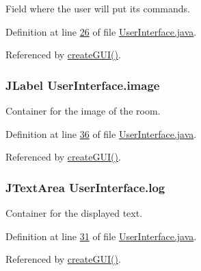 Field where the user will put its commands. 



Definition at line \hyperlink{UserInterface_8java_source_l00026}{26} of file \hyperlink{UserInterface_8java_source}{User\-Interface.\-java}.



Referenced by \hyperlink{UserInterface_8java_source_l00106}{create\-G\-U\-I()}.

\hypertarget{classUserInterface_a0d115eb19b54f3e002ec6aa0fcfb1db4}{
\subsubsection[{image}]{\setlength{\rightskip}{0pt plus 5cm}J\-Label User\-Interface.\-image\hspace{0.3cm}{\ttfamily [private]}}}\label{classUserInterface_a0d115eb19b54f3e002ec6aa0fcfb1db4}


Container for the image of the room. 



Definition at line \hyperlink{UserInterface_8java_source_l00036}{36} of file \hyperlink{UserInterface_8java_source}{User\-Interface.\-java}.



Referenced by \hyperlink{UserInterface_8java_source_l00106}{create\-G\-U\-I()}.

\hypertarget{classUserInterface_a7f6ed10812f99e2cc6ce5f497d8ba2a0}{
\subsubsection[{log}]{\setlength{\rightskip}{0pt plus 5cm}J\-Text\-Area User\-Interface.\-log\hspace{0.3cm}{\ttfamily [private]}}}\label{classUserInterface_a7f6ed10812f99e2cc6ce5f497d8ba2a0}


Container for the displayed text. 



Definition at line \hyperlink{UserInterface_8java_source_l00031}{31} of file \hyperlink{UserInterface_8java_source}{User\-Interface.\-java}.



Referenced by \hyperlink{UserInterface_8java_source_l00106}{create\-G\-U\-I()}.

